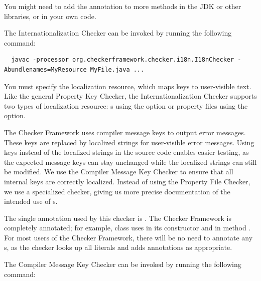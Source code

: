 You might need to add the  annotation to more methods in the
JDK or other libraries, or in your own code.



The Internationalization Checker can be invoked by running the following
command:

\begin{smaller}
\begin{Verbatim}
  javac -processor org.checkerframework.checker.i18n.I18nChecker -Abundlenames=MyResource MyFile.java ...
\end{Verbatim}
\end{smaller}

You must specify the localization resource, which maps keys to user-visible
text.  Like the general Property Key Checker, the Internationalization Checker
supports two types of localization resource:
s using the
 option
or property files using the
 option.




The Checker Framework uses compiler message keys to output error messages.
These keys are replaced by localized strings for user-visible error messages.
Using keys instead of the localized strings in the source code enables easier
testing, as the expected message keys can stay unchanged while the localized
strings can still be modified.
We use the Compiler Message Key Checker to ensure that all internal
keys are correctly localized.
Instead of using the Property File Checker, we use a specialized checker,
giving us more precise documentation of the intended use of s.

The single annotation used by this checker is
.
The Checker Framework is completely annotated;
for example, class 
uses  in its constructor and in method .
For most users of the Checker Framework, there will be no need to annotate any
s, as the checker looks up all  literals and adds
annotations as appropriate.

The Compiler Message Key Checker can be invoked by running the following
command:

